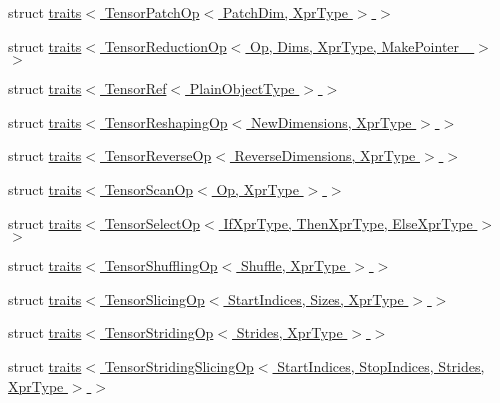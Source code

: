 \begin{DoxyCompactItemize}
\item 
struct \hyperlink{struct_eigen_1_1internal_1_1traits_3_01_tensor_patch_op_3_01_patch_dim_00_01_xpr_type_01_4_01_4}{traits$<$ Tensor\+Patch\+Op$<$ Patch\+Dim, Xpr\+Type $>$ $>$}
\item 
struct \hyperlink{struct_eigen_1_1internal_1_1traits_3_01_tensor_reduction_op_3_01_op_00_01_dims_00_01_xpr_type_00_01_make_pointer___01_4_01_4}{traits$<$ Tensor\+Reduction\+Op$<$ Op, Dims, Xpr\+Type, Make\+Pointer\+\_\+ $>$ $>$}
\item 
struct \hyperlink{struct_eigen_1_1internal_1_1traits_3_01_tensor_ref_3_01_plain_object_type_01_4_01_4}{traits$<$ Tensor\+Ref$<$ Plain\+Object\+Type $>$ $>$}
\item 
struct \hyperlink{struct_eigen_1_1internal_1_1traits_3_01_tensor_reshaping_op_3_01_new_dimensions_00_01_xpr_type_01_4_01_4}{traits$<$ Tensor\+Reshaping\+Op$<$ New\+Dimensions, Xpr\+Type $>$ $>$}
\item 
struct \hyperlink{struct_eigen_1_1internal_1_1traits_3_01_tensor_reverse_op_3_01_reverse_dimensions_00_01_xpr_type_01_4_01_4}{traits$<$ Tensor\+Reverse\+Op$<$ Reverse\+Dimensions, Xpr\+Type $>$ $>$}
\item 
struct \hyperlink{struct_eigen_1_1internal_1_1traits_3_01_tensor_scan_op_3_01_op_00_01_xpr_type_01_4_01_4}{traits$<$ Tensor\+Scan\+Op$<$ Op, Xpr\+Type $>$ $>$}
\item 
struct \hyperlink{struct_eigen_1_1internal_1_1traits_3_01_tensor_select_op_3_01_if_xpr_type_00_01_then_xpr_type_00_01_else_xpr_type_01_4_01_4}{traits$<$ Tensor\+Select\+Op$<$ If\+Xpr\+Type, Then\+Xpr\+Type, Else\+Xpr\+Type $>$ $>$}
\item 
struct \hyperlink{struct_eigen_1_1internal_1_1traits_3_01_tensor_shuffling_op_3_01_shuffle_00_01_xpr_type_01_4_01_4}{traits$<$ Tensor\+Shuffling\+Op$<$ Shuffle, Xpr\+Type $>$ $>$}
\item 
struct \hyperlink{struct_eigen_1_1internal_1_1traits_3_01_tensor_slicing_op_3_01_start_indices_00_01_sizes_00_01_xpr_type_01_4_01_4}{traits$<$ Tensor\+Slicing\+Op$<$ Start\+Indices, Sizes, Xpr\+Type $>$ $>$}
\item 
struct \hyperlink{struct_eigen_1_1internal_1_1traits_3_01_tensor_striding_op_3_01_strides_00_01_xpr_type_01_4_01_4}{traits$<$ Tensor\+Striding\+Op$<$ Strides, Xpr\+Type $>$ $>$}
\item 
struct \hyperlink{struct_eigen_1_1internal_1_1traits_3_01_tensor_striding_slicing_op_3_01_start_indices_00_01_stop9ad1ed36f680305576abbd4a33c38a6e}{traits$<$ Tensor\+Striding\+Slicing\+Op$<$ Start\+Indices, Stop\+Indices, Strides, Xpr\+Type $>$ $>$}

\end{DoxyCompactItemize}

